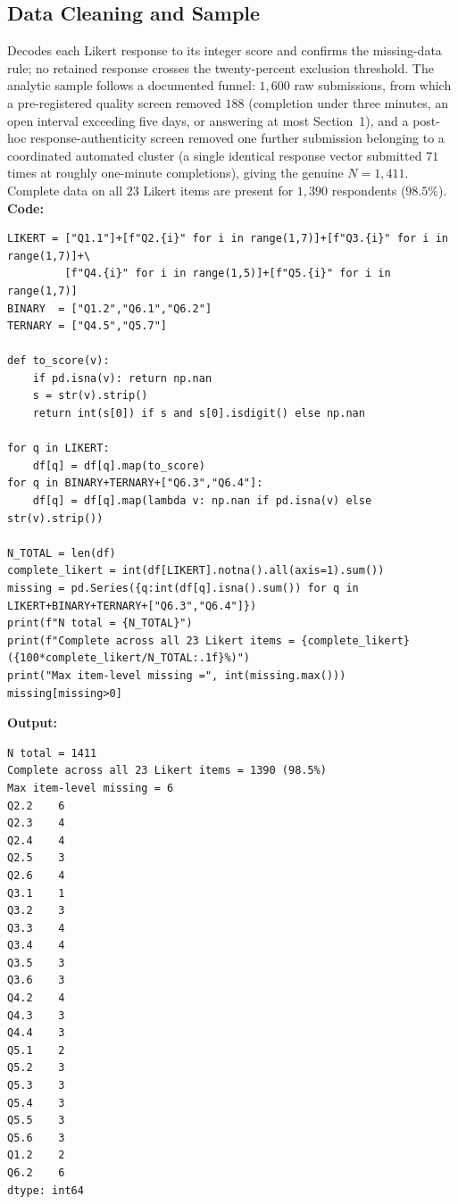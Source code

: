 \subsection{Data Cleaning and Sample}
Decodes each Likert response to its integer score and confirms the missing-data rule; no retained response crosses the twenty-percent exclusion threshold. The analytic sample follows a documented funnel: $1{,}600$ raw submissions, from which a pre-registered quality screen removed $188$ (completion under three minutes, an open interval exceeding five days, or answering at most Section~1), and a post-hoc response-authenticity screen removed one further submission belonging to a coordinated automated cluster (a single identical response vector submitted $71$ times at roughly one-minute completions), giving the genuine $N=1{,}411$. Complete data on all $23$ Likert items are present for $1{,}390$ respondents ($98.5\%$).
\noindent\textbf{Code:}\nopagebreak
{\tiny\begin{verbatim}
LIKERT = ["Q1.1"]+[f"Q2.{i}" for i in range(1,7)]+[f"Q3.{i}" for i in range(1,7)]+\
         [f"Q4.{i}" for i in range(1,5)]+[f"Q5.{i}" for i in range(1,7)]
BINARY  = ["Q1.2","Q6.1","Q6.2"]
TERNARY = ["Q4.5","Q5.7"]

def to_score(v):
    if pd.isna(v): return np.nan
    s = str(v).strip()
    return int(s[0]) if s and s[0].isdigit() else np.nan

for q in LIKERT:
    df[q] = df[q].map(to_score)
for q in BINARY+TERNARY+["Q6.3","Q6.4"]:
    df[q] = df[q].map(lambda v: np.nan if pd.isna(v) else str(v).strip())

N_TOTAL = len(df)
complete_likert = int(df[LIKERT].notna().all(axis=1).sum())
missing = pd.Series({q:int(df[q].isna().sum()) for q in LIKERT+BINARY+TERNARY+["Q6.3","Q6.4"]})
print(f"N total = {N_TOTAL}")
print(f"Complete across all 23 Likert items = {complete_likert} ({100*complete_likert/N_TOTAL:.1f}%)")
print("Max item-level missing =", int(missing.max()))
missing[missing>0]
\end{verbatim}}
\noindent\textbf{Output:}\nopagebreak
{\scriptsize\begin{verbatim}
N total = 1411
Complete across all 23 Likert items = 1390 (98.5%)
Max item-level missing = 6
Q2.2    6
Q2.3    4
Q2.4    4
Q2.5    3
Q2.6    4
Q3.1    1
Q3.2    3
Q3.3    4
Q3.4    4
Q3.5    3
Q3.6    3
Q4.2    4
Q4.3    3
Q4.4    3
Q5.1    2
Q5.2    3
Q5.3    3
Q5.4    3
Q5.5    3
Q5.6    3
Q1.2    2
Q6.2    6
dtype: int64
\end{verbatim}}

